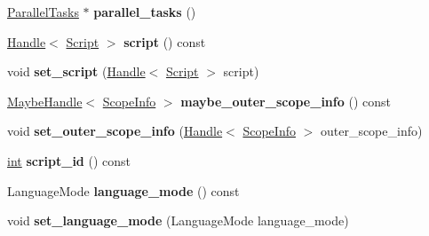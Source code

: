 \begin{DoxyCompactItemize}
\item 
\mbox{\label{classv8_1_1internal_1_1ParseInfo_ab92a4bbd9d2008b7f5617c846ff2cc7d}} 
\mbox{\hyperlink{classv8_1_1internal_1_1ParseInfo_1_1ParallelTasks}{Parallel\+Tasks}} $\ast$ {\bfseries parallel\+\_\+tasks} ()
\item 
\mbox{\label{classv8_1_1internal_1_1ParseInfo_a5d37f5a74389c601a475b50d0ac854fd}} 
\mbox{\hyperlink{classv8_1_1internal_1_1Handle}{Handle}}$<$ \mbox{\hyperlink{classv8_1_1internal_1_1Script}{Script}} $>$ {\bfseries script} () const
\item 
\mbox{\label{classv8_1_1internal_1_1ParseInfo_a8275f3c8288ce7fcb7d24329a2de2b59}} 
void {\bfseries set\+\_\+script} (\mbox{\hyperlink{classv8_1_1internal_1_1Handle}{Handle}}$<$ \mbox{\hyperlink{classv8_1_1internal_1_1Script}{Script}} $>$ script)
\item 
\mbox{\label{classv8_1_1internal_1_1ParseInfo_a4c3687ab3c07e4e9b23540fde6d3a352}} 
\mbox{\hyperlink{classv8_1_1internal_1_1MaybeHandle}{Maybe\+Handle}}$<$ \mbox{\hyperlink{classv8_1_1internal_1_1ScopeInfo}{Scope\+Info}} $>$ {\bfseries maybe\+\_\+outer\+\_\+scope\+\_\+info} () const
\item 
\mbox{\label{classv8_1_1internal_1_1ParseInfo_a615754de3195b25bd2cba1749ec9f1d0}} 
void {\bfseries set\+\_\+outer\+\_\+scope\+\_\+info} (\mbox{\hyperlink{classv8_1_1internal_1_1Handle}{Handle}}$<$ \mbox{\hyperlink{classv8_1_1internal_1_1ScopeInfo}{Scope\+Info}} $>$ outer\+\_\+scope\+\_\+info)
\item 
\mbox{\label{classv8_1_1internal_1_1ParseInfo_a665c48fd5d689fb379abfdc468e5a470}} 
\mbox{\hyperlink{classint}{int}} {\bfseries script\+\_\+id} () const
\item 
\mbox{\label{classv8_1_1internal_1_1ParseInfo_ab63f3da4add044b39490b94e4b74ecd2}} 
Language\+Mode {\bfseries language\+\_\+mode} () const
\item 
\mbox{\label{classv8_1_1internal_1_1ParseInfo_aa05e14567a819f90061a984f7abd163c}} 
void {\bfseries set\+\_\+language\+\_\+mode} (Language\+Mode language\+\_\+mode)
\end{DoxyCompactItemize}

